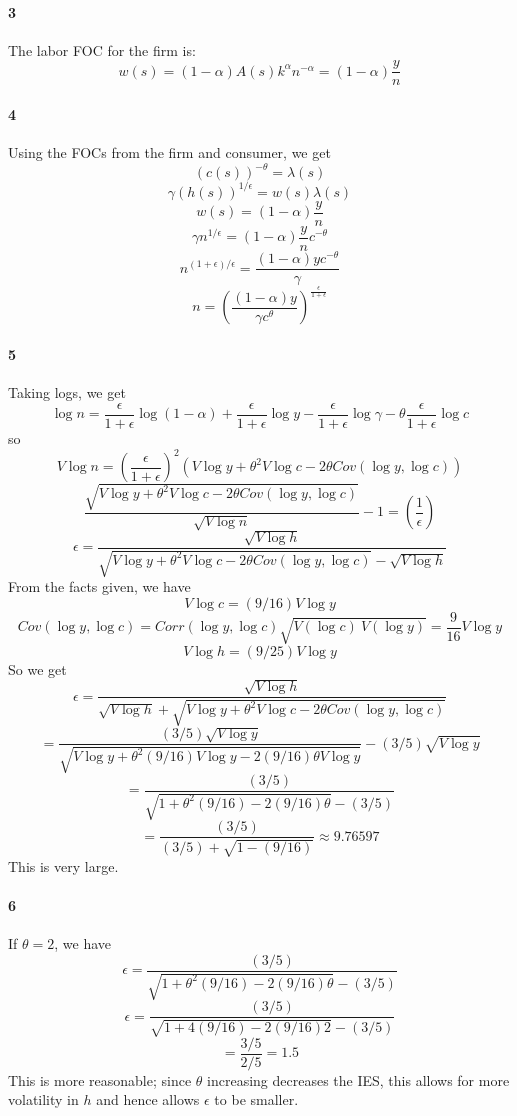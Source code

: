 \documentclass[10pt,letter]{article}
\newcommand{\problempart}[1]{\paragraph{#1}}
\begin{document}
\problempart{3}
The labor FOC for the firm is:
\[ w(s) = (1-\alpha)A(s)k^\alpha n^{-\alpha} = (1-\alpha) \frac{y}{n} \]
\problempart{4}
Using the FOCs from the firm and consumer, we get
\[ (c(s))^{-\theta} = \lambda(s) \]
\[ \gamma (h(s))^{1/\epsilon} = w(s)\lambda(s)\]
\[ w(s) =  (1-\alpha) \frac{y}{n} \]
\[ \gamma n^{1/\epsilon} =(1-\alpha) \frac{y}{n} c^{-\theta} \]
\[ n^{(1+\epsilon)/\epsilon }= \frac{(1-\alpha)yc^{-\theta}}{\gamma}  \]
\[ n = \left( \frac{(1-\alpha)y}{\gamma c^\theta} \right)^{\frac{\epsilon}{1+\epsilon}} \]
\problempart{5}
Taking logs, we get
\[ \log n = \frac{\epsilon}{1+\epsilon} \log (1-\alpha) + \frac{\epsilon}{1+\epsilon} \log y - \frac{\epsilon}{1+\epsilon} \log \gamma - \theta \frac{\epsilon}{1+\epsilon} \log c  \]
so
\[ V\log n = \left(\frac{\epsilon}{1+\epsilon}\right)^2 (V \log y  + \theta^2 V \log c - 2 \theta Cov(\log y, \log c)) \]
\[  \frac{\sqrt{V \log y  + \theta^2 V \log c - 2 \theta Cov(\log y, \log c)}}{\sqrt{V\log n}} - 1 = \left(\frac{1}{\epsilon}\right)  \]
\[ \epsilon = \frac{\sqrt{V\log h}}{  \sqrt{V \log y  + \theta^2 V \log c - 2 \theta Cov(\log y, \log c)} - \sqrt{V\log h} }  \]
From the facts given, we have
\[ V\log c = (9/16) V \log y \]
\[ Cov(\log y, \log c) = Corr(\log y, \log c) \sqrt{V (\log c) \  V (\log y)} = \frac{9}{16} V \log y \]
\[ V\log h = (9/25) V \log y \]
So we get
\[ \epsilon = \frac{\sqrt{V\log h}}{ \sqrt{V\log h} + \sqrt{V \log y  + \theta^2 V \log c - 2 \theta Cov(\log y, \log c)}}  \]
\[ = \frac{(3/5)\sqrt{V\log y}}{  \sqrt{V \log y  + \theta^2 (9/16) V \log y - 2(9/16) \theta V \log y}} - (3/5) \sqrt{V\log y} \]
\[ = \frac{(3/5)}{ \sqrt{1 +  \theta^2 (9/16) - 2(9/16) \theta } - (3/5)} \]
\[ = \frac{(3/5)}{ (3/5) + \sqrt{1  - (9/16) }} \approx 9.76597 \]
This is very large.
\problempart{6}
If $\theta = 2$, we have
\[ \epsilon = \frac{(3/5)}{ \sqrt{1  + \theta^2 (9/16) - 2(9/16) \theta } - (3/5)} \]
\[ \epsilon = \frac{(3/5)}{ \sqrt{1  + 4 (9/16) - 2(9/16)2 } - (3/5)} \]
\[ = \frac{3/5}{2/5} = 1.5 \]
This is more reasonable; since $\theta$ increasing decreases the IES, this allows for more volatility in $h$ and hence allows $\epsilon$ to be smaller.
\end{document}
